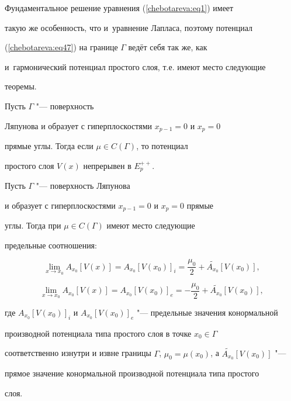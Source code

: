 Фундаментальное решение уравнения (\ref{chebotareva:eq1}) имеет


такую же особенность,  что и~уравнение Лапласа,  поэтому потенциал


(\ref{chebotareva:eq47}) на границе $\Gamma$ ведёт себя так же,  как 


и~гармонический потенциал простого слоя,  т.е. имеют место следующие


теоремы.


\begin{theorem}[6]Пусть $\Gamma $ "--- поверхность


Ляпунова и образует с гиперплоскостями $x_{p - 1} = 0$ и $x_p = 0$


прямые углы. Тогда  если $\mu \in C(\Gamma )$,  то потенциал


простого слоя $V(x)$ непрерывен в $E_p^{++}$.


\end{theorem}





\begin{theorem}[7]Пусть $\Gamma $ "--- поверхность Ляпунова


и образует с гиперплоскостями $x_{p - 1} = 0$ и $x_p = 0$ прямые


углы. Тогда при $\mu \in C(\Gamma )$ имеют место следующие


предельные соотношения{\rm:}


\[


\mathop {\lim }\limits_{x \to x_0 } A_{x_0 } \left[ {V(x)} \right]


= A_{x_0 } \left[ {V(x_0 )} \right]_i = \frac{\mu _0 }{2} +


\widetilde{A_{x_0 }} \left[ {V(x_0 )} \right], 


\]


\[


\mathop {\lim }\limits_{x \to x_0 } A_{x_0 } \left[ {V(x)} \right]


= A_{x_0 } \left[ {V(x_0 )} \right]_e = - \frac{\mu _0 }{2} +


\widetilde{A_{x_0 }} \left[ {V(x_0 )} \right], 


\]


где $A_{x_0 } \left[ {V(x_0 )} \right]_i$  и $A_{x_0 } \left[


{V(x_0 )} \right]_e$ "--- предельные значения конормальной


производной потенциала типа простого слоя в точке $x_0 \in \Gamma$


соответственно изнутри и извне границы $\Gamma$,  $\mu _0 = \mu


(x_0 )$,  а $\widetilde{A_{x_0 }} \left[ {V(x_0 )} \right]$ "---


прямое значение конормальной производной потенциала типа простого


слоя.


\end{theorem}





